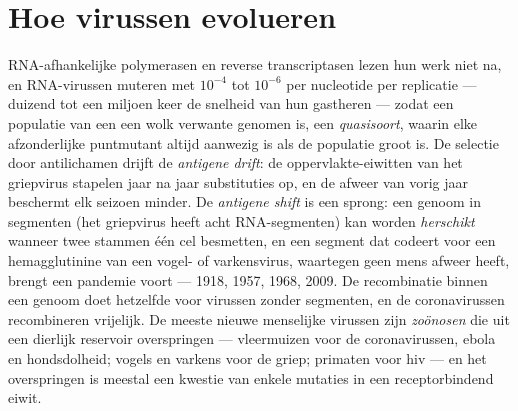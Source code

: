 \section{Hoe virussen evolueren}

\begin{definition}\label{def:b3:virology:evolution}
RNA-afhankelijke polymerasen en reverse transcriptasen lezen hun werk
niet na, en RNA-virussen muteren met $10^{-4}$ tot $10^{-6}$ per
nucleotide per replicatie --- duizend tot een miljoen keer de snelheid
van hun gastheren --- zodat een populatie van een  een wolk
verwante genomen is, een \emph{quasisoort}, waarin elke afzonderlijke
puntmutant altijd aanwezig is als de populatie groot is. De selectie
door antilichamen drijft de \emph{antigene drift}: de
oppervlakte-eiwitten van het griepvirus stapelen jaar na jaar
substituties op, en de afweer van vorig jaar beschermt elk seizoen
minder. De \emph{antigene shift} is een sprong: een genoom in segmenten
(het griepvirus heeft acht RNA-segmenten) kan worden
\emph{herschikt} wanneer twee stammen één cel besmetten, en een segment
dat codeert voor een hemagglutinine van een vogel- of varkensvirus,
waartegen geen mens afweer heeft, brengt een pandemie voort --- 1918,
1957, 1968, 2009. De recombinatie binnen een genoom doet hetzelfde voor
virussen zonder segmenten, en de coronavirussen recombineren vrijelijk.
De meeste nieuwe menselijke virussen zijn \emph{zoönosen} die uit een
dierlijk reservoir overspringen --- vleermuizen voor de coronavirussen,
ebola en hondsdolheid; vogels en varkens voor de griep; primaten voor
hiv --- en het overspringen is meestal een kwestie van enkele mutaties
in een receptorbindend eiwit.
\end{definition}

